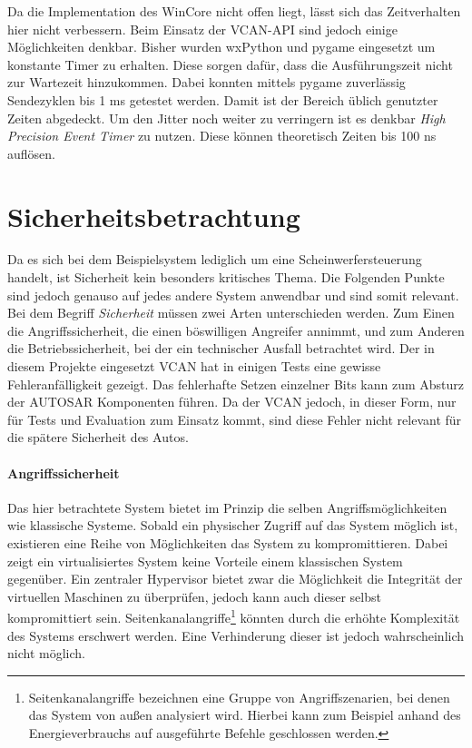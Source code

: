 \documentclass[
  a4paper,					    %
  twoside,
  DIV=calc,     				%
  bibliography=totoc,
  cleardoublepage=empty,
  ngerman,     					%
  final       					%
]{scrbook}
\begin{document}
Da die Implementation des WinCore nicht offen liegt, lässt sich das Zeitverhalten hier nicht verbessern. Beim Einsatz der VCAN-API sind jedoch einige Möglichkeiten denkbar. Bisher wurden wxPython und pygame eingesetzt um konstante Timer zu erhalten. Diese sorgen dafür, dass die Ausführungszeit nicht zur Wartezeit hinzukommen. Dabei konnten mittels pygame zuverlässig Sendezyklen bis 1 ms getestet werden. Damit ist der Bereich üblich genutzter Zeiten abgedeckt. Um den Jitter noch weiter zu verringern ist es denkbar \emph{High Precision Event Timer} zu nutzen. Diese können theoretisch Zeiten bis 100 ns auflösen.



\section{Sicherheitsbetrachtung}
\label{sec:Sicherheit_Beispiel}
Da es sich bei dem Beispielsystem lediglich um eine Scheinwerfersteuerung handelt, ist Sicherheit kein besonders kritisches Thema. Die Folgenden Punkte sind jedoch genauso auf jedes andere System anwendbar und sind somit relevant. Bei dem Begriff \emph{Sicherheit} müssen zwei Arten unterschieden werden. Zum Einen die Angriffssicherheit, die einen böswilligen Angreifer annimmt, und zum Anderen die Betriebssicherheit, bei der ein technischer Ausfall betrachtet wird. Der in diesem Projekte eingesetzt VCAN hat in einigen Tests eine gewisse Fehleranfälligkeit gezeigt. Das fehlerhafte Setzen einzelner Bits kann zum Absturz der AUTOSAR Komponenten führen. Da der VCAN jedoch, in dieser Form, nur für Tests und Evaluation zum Einsatz kommt, sind diese Fehler nicht relevant für die spätere Sicherheit des Autos.

\paragraph{Angriffssicherheit}
Das hier betrachtete System bietet im Prinzip die selben Angriffsmöglichkeiten wie klassische Systeme. Sobald ein physischer Zugriff auf das System möglich ist, existieren eine Reihe von Möglichkeiten das System zu kompromittieren. Dabei zeigt ein virtualisiertes System keine Vorteile einem klassischen System gegenüber. Ein zentraler Hypervisor bietet zwar die Möglichkeit die Integrität der virtuellen Maschinen zu überprüfen, jedoch kann auch dieser selbst kompromittiert sein. Seitenkanalangriffe\footnote{Seitenkanalangriffe bezeichnen eine Gruppe von Angriffszenarien, bei denen das System von außen analysiert wird. Hierbei kann zum Beispiel anhand des Energieverbrauchs auf ausgeführte Befehle geschlossen werden.} könnten durch die erhöhte Komplexität des Systems erschwert werden. Eine Verhinderung dieser ist jedoch wahrscheinlich nicht möglich.
\end{document}
